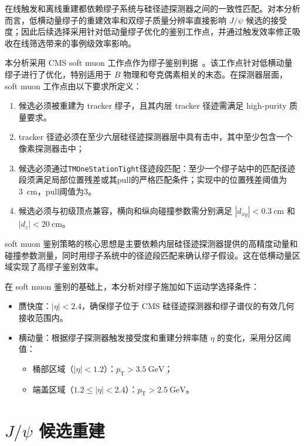 在线触发和离线重建都依赖缪子系统与硅径迹探测器之间的一致性匹配。对本分析而言，低横动量缪子的重建效率和双缪子质量分辨率直接影响 $J/\psi$ 候选的接受度；因此后续选择采用针对低动量缪子优化的鉴别工作点，并通过触发效率修正吸收在线筛选带来的事例级效率影响。

本分析采用 CMS soft muon 工作点作为缪子鉴别判据~\cite{CMS_MUON_PERF_13TEV}。该工作点针对低横动量缪子进行了优化，特别适用于 $B$ 物理和夸克偶素相关的末态。在探测器层面，soft muon 工作点由以下要求所定义：

\begin{enumerate}
  \item 候选必须被重建为 tracker 缪子，且其内层 tracker 径迹需满足 high-purity 质量要求。
  \item tracker 径迹必须在至少六层硅径迹探测器层中具有击中，其中至少包含一个像素探测器击中；
  \item 候选必须通过\texttt{TMOneStationTight}径迹段匹配：至少一个缪子站中的匹配径迹段须满足局部位置残差或其pull的严格匹配条件；实现中的位置残差阈值为\SI{3}{\centi\meter}，pull阈值为3。
  \item 候选必须与初级顶点兼容，横向和纵向碰撞参数需分别满足 $|d_{xy}| < \SI{0.3}{\centi\meter}$ 和 $|d_z| < \SI{20}{\centi\meter}$。
\end{enumerate}

soft muon 鉴别策略的核心思想是主要依赖内层硅径迹探测器提供的高精度动量和碰撞参数测量，同时用缪子系统中的径迹段匹配来确认缪子假设。这在低横动量区域实现了高缪子鉴别效率。

在 soft muon 鉴别的基础上，本分析对缪子施加如下运动学选择条件：

\begin{itemize}
  \item 赝快度：$|\eta| < 2.4$，确保缪子位于 CMS 硅径迹探测器和缪子谱仪的有效几何接收范围内。
  \item 横动量：根据缪子探测器触发接受度和重建分辨率随 $\eta$ 的变化，采用分区阈值：
    \begin{itemize}
      \item 桶部区域（$|\eta| < 1.2$）：$p_{\mathrm{T}} > \SI{3.5}{\giga\eV}$；
      \item 端盖区域（$1.2 \leq |\eta| < 2.4$）：$p_{\mathrm{T}} > \SI{2.5}{\giga\eV}$。
    \end{itemize}
\end{itemize}

\section{\texorpdfstring{$J/\psi$}{J/psi} 候选重建}
\label{sec:jpsi-reco}


